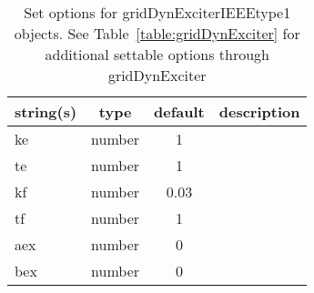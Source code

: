 \begin{table}[ht]
\centering
\begin{tabular}{p{5cm} c c p{7cm}}
\hline
string(s) & type & default & description \\
\hline
ke & number & 1 & \\
te & number & 1 & \\
kf & number & 0.03 & \\
tf & number & 1 & \\
aex & number & 0 & \\
bex & number & 0 & \\
\hline
\end{tabular}
\caption{Set options for gridDynExciterIEEEtype1 objects. See Table~\ref{table:gridDynExciter} for additional settable options through gridDynExciter}
\label{table:gridDynExciterIEEEtype1}
\end{table}
